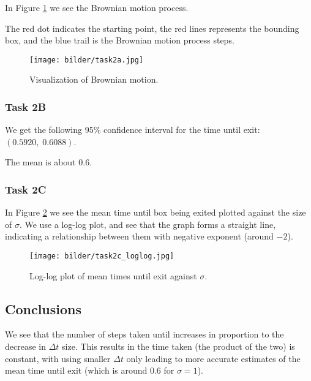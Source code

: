 In Figure \ref{fig:2a} we see the Brownian motion process.

The red dot indicates the starting point, the red lines represents the bounding box, and the blue trail is the Brownian motion process steps. 

\begin{figure}[H]
    \centering
    \texttt{[image: bilder/task2a.jpg]}
    \caption{Visualization of Brownian motion.}
    \label{fig:2a}
\end{figure}

\subsubsection{Task 2B}
\label{sec:res2B}

We get the following 95\% confidence interval for the time until exit: $(0.5920, \;   0.6088)$.

The mean is about $0.6$.

\subsubsection{Task 2C}
\label{sec:res2C}

In Figure \ref{fig:2c} we see the mean time until box being exited plotted against the size of $\sigma$. We use a log-log plot, and see that the graph forms a straight line, indicating a relationship between them with negative exponent (around $-2$).

\begin{figure}[H]
    \centering
    \texttt{[image: bilder/task2c\_loglog.jpg]}
    \caption{Log-log plot of mean times until exit against $\sigma$.}
    \label{fig:2c}
\end{figure}

\subsection{Conclusions}
\label{sec:conc2}


We see that the number of steps taken until increases in proportion to the decrease in $\Delta t$ size. This results in the time taken (the product of the two) is constant, with using smaller $\Delta t$ only leading to more accurate estimates of the mean time until exit (which is around $0.6$ for $\sigma = 1$).

